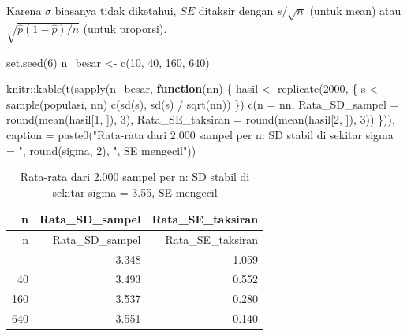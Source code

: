 \documentclass[
  indonesian,
  letterpaper,
]{book}
\newenvironment{Shaded}{\begin{snugshade}}{\end{snugshade}}
\newcommand{\AttributeTok}[1]{\textcolor[rgb]{0.40,0.45,0.13}{#1}}
\newcommand{\ControlFlowTok}[1]{\textcolor[rgb]{0.00,0.23,0.31}{\textbf{#1}}}
\newcommand{\DecValTok}[1]{\textcolor[rgb]{0.68,0.00,0.00}{#1}}
\newcommand{\FunctionTok}[1]{\textcolor[rgb]{0.28,0.35,0.67}{#1}}
\newcommand{\NormalTok}[1]{\textcolor[rgb]{0.00,0.23,0.31}{#1}}
\newcommand{\OtherTok}[1]{\textcolor[rgb]{0.00,0.23,0.31}{#1}}
\newcommand{\SpecialCharTok}[1]{\textcolor[rgb]{0.37,0.37,0.37}{#1}}
\newcommand{\StringTok}[1]{\textcolor[rgb]{0.13,0.47,0.30}{#1}}
\begin{document}
Karena \(\sigma\) biasanya tidak diketahui, \(SE\) ditaksir dengan
\(s/\sqrt{n}\) (untuk mean) atau \(\sqrt{\hat{p}(1 - \hat{p})/n}\)
(untuk proporsi).

\begin{Shaded}
\begin{Highlighting}[]
\FunctionTok{set.seed}\NormalTok{(}\DecValTok{6}\NormalTok{)}
\NormalTok{n\_besar }\OtherTok{\textless{}{-}} \FunctionTok{c}\NormalTok{(}\DecValTok{10}\NormalTok{, }\DecValTok{40}\NormalTok{, }\DecValTok{160}\NormalTok{, }\DecValTok{640}\NormalTok{)}

\NormalTok{knitr}\SpecialCharTok{::}\FunctionTok{kable}\NormalTok{(}\FunctionTok{t}\NormalTok{(}\FunctionTok{sapply}\NormalTok{(n\_besar, }\ControlFlowTok{function}\NormalTok{(nn) \{}
\NormalTok{  hasil }\OtherTok{\textless{}{-}} \FunctionTok{replicate}\NormalTok{(}\DecValTok{2000}\NormalTok{, \{}
\NormalTok{    s }\OtherTok{\textless{}{-}} \FunctionTok{sample}\NormalTok{(populasi, nn)}
    \FunctionTok{c}\NormalTok{(}\FunctionTok{sd}\NormalTok{(s), }\FunctionTok{sd}\NormalTok{(s) }\SpecialCharTok{/} \FunctionTok{sqrt}\NormalTok{(nn))}
\NormalTok{  \})}
  \FunctionTok{c}\NormalTok{(}\AttributeTok{n =}\NormalTok{ nn,}
    \AttributeTok{Rata\_SD\_sampel =} \FunctionTok{round}\NormalTok{(}\FunctionTok{mean}\NormalTok{(hasil[}\DecValTok{1}\NormalTok{, ]), }\DecValTok{3}\NormalTok{),}
    \AttributeTok{Rata\_SE\_taksiran =} \FunctionTok{round}\NormalTok{(}\FunctionTok{mean}\NormalTok{(hasil[}\DecValTok{2}\NormalTok{, ]), }\DecValTok{3}\NormalTok{))}
\NormalTok{\})), }\AttributeTok{caption =} \FunctionTok{paste0}\NormalTok{(}\StringTok{"Rata{-}rata dari 2.000 sampel per n: SD stabil di sekitar sigma = "}\NormalTok{,}
                      \FunctionTok{round}\NormalTok{(sigma, }\DecValTok{2}\NormalTok{), }\StringTok{", SE mengecil"}\NormalTok{))}
\end{Highlighting}
\end{Shaded}

\begin{longtable}[]{@{}rrr@{}}
\caption{Rata-rata dari 2.000 sampel per n: SD stabil di sekitar sigma =
3.55, SE mengecil}\tabularnewline
\toprule\noalign{}
n & Rata\_SD\_sampel & Rata\_SE\_taksiran \\
\midrule\noalign{}
\endfirsthead
\toprule\noalign{}
n & Rata\_SD\_sampel & Rata\_SE\_taksiran \\
\midrule\noalign{}
\endhead
\bottomrule\noalign{}
\endlastfoot
10 & 3.348 & 1.059 \\
40 & 3.493 & 0.552 \\
160 & 3.537 & 0.280 \\
640 & 3.551 & 0.140 \\
\end{longtable}
\end{document}
